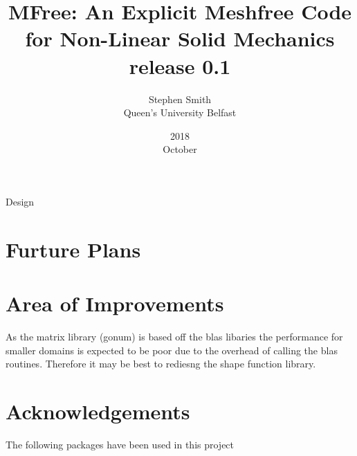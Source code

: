 \documentclass[openany,oneside,12pt]{book}
\title{MFree: An Explicit Meshfree Code for Non-Linear Solid Mechanics \\ release 0.1}
\date{2018 \\ October}
\author{Stephen Smith \\ Queen's University Belfast}
\begin{document}
\frontmatter
\maketitle
\tableofcontents
\mainmatter


 {Design}	
\chapter{Furture Plans}
\chapter{Area of Improvements}	
As the matrix library (gonum) is based off the blas libaries the performance for smaller domains is expected to be poor due to the overhead of calling the blas routines. Therefore it may be best to rediesng the shape function library.
\chapter{Acknowledgements}
The following packages have been used in this project
\end{document}
